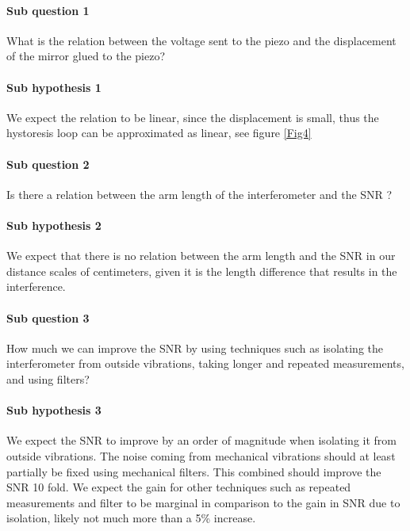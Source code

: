 \documentclass[a4paper,11pt]{article} %
\begin{document}
\paragraph{Sub question 1} What is the relation between the voltage sent to the piezo and the displacement of the mirror glued to the piezo?

\paragraph{Sub hypothesis 1} We expect the relation to be linear, since the displacement is small, thus the hystoresis loop can be approximated as linear, see figure \ref{Fig4}

\paragraph{Sub question 2} Is there a relation between the arm length of the interferometer and the SNR ?

\paragraph{Sub hypothesis 2} We expect that there is no relation between the arm length and the SNR in our distance scales of centimeters, given it is the length difference that results in the interference.

\paragraph{Sub question 3} How much we can improve the SNR by using techniques such as isolating the interferometer from outside vibrations, taking longer and repeated measurements, and using filters?

\paragraph{Sub hypothesis 3} We expect the SNR to improve by an order of magnitude when isolating it from outside vibrations. The noise coming from mechanical vibrations should at least partially be fixed using mechanical filters. This combined should improve the SNR 10 fold. We expect the gain for other techniques such as repeated measurements and filter to be marginal in comparison to the gain in SNR due to isolation, likely not much more than a 5\% increase.

\end{document}
